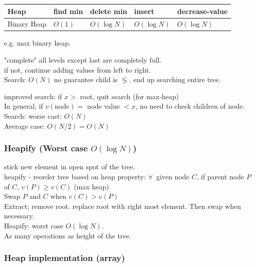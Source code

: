 \documentclass[10pt]{amsart}
\begin{document}
\begin{multicols*}{2}
\begin{center}
	\begin{tabular}{ l | l | l | l | l  }
		\hline
		Heap & find min & delete min & insert & decrease-value \\ \hline
		Binary Heap & $O(1)$ & $O(\log{N})$ & $O(\log{N})$ & $O(\log{N})$ \\ \hline 
		\hline
	\end{tabular}
\end{center}

e.g. max binary heap.

"complete" all levels except last are completely full. \\
if not, continue adding values from left to right. \\

Search: $O(N)$ no guarantee child is $\lessgtr$. end up searching entire tree.

improved search: if $x >$ root, quit search (for max-heap) \\
In general, if $v(\text{node}) =$ node value $< x$, no need to check children of node. \\

Search: worse cast: $O(N)$ \\
\phantom{Search} Average case: $O(N/2) = O(N)$ \\

\subsubsection{Heapify (Worst case $O(\log{N})$)} 

stick new element in open spot of the tree. \\
heapify - reorder tree based on heap property: $\forall \, $ given node $C$, if parent node $P$ of $C$, $v(P) \geq v(C)$ (max heap) \\

Swap $P$ and $C$ when $v(C) > v(P)$ \\
Extract; remove root. replace root with right most element. Then swap when necessary. \\

Heapify: worst case $O(\log{N})$. \\
As many operations as height of the tree.

\subsubsection{Heap implementation (array)}


\end{multicols*}
\end{document}
